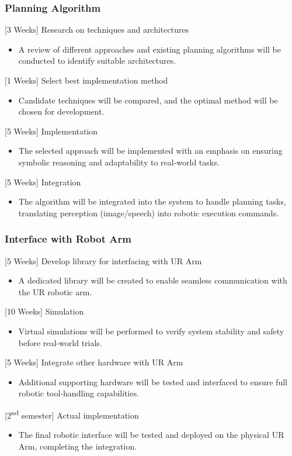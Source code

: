 \documentclass[12pt]{extarticle}
\begin{document}
\subsubsection{Planning Algorithm}
[3 Weeks] Research on techniques and architectures
\begin{itemize}
    \item A review of different approaches and existing planning algorithms will be conducted to identify suitable architectures.
\end{itemize}
[1 Weeks] Select best implementation method
\begin{itemize}
    \item Candidate techniques will be compared, and the optimal method will be chosen for development.
\end{itemize}
[5 Weeks] Implementation
\begin{itemize}
    \item The selected approach will be implemented with an emphasis on ensuring symbolic reasoning and adaptability to real-world tasks.
\end{itemize}
[5 Weeks] Integration
\begin{itemize}
    \item The algorithm will be integrated into the system to handle planning tasks, translating perception (image/speech) into robotic execution commands.
\end{itemize}
\subsubsection{Interface with Robot Arm}
[5 Weeks] Develop library for interfacing with UR Arm
\begin{itemize}
    \item A dedicated library will be created to enable seamless communication with the UR robotic arm.
\end{itemize}
[10 Weeks] Simulation
\begin{itemize}
    \item Virtual simulations will be performed to verify system stability and safety before real-world trials.
\end{itemize}
[5 Weeks] Integrate other hardware with UR Arm
\begin{itemize}
    \item Additional supporting hardware will be tested and interfaced to ensure full robotic tool-handling capabilities.
\end{itemize}
[2\textsuperscript{nd} semester] Actual implementation
\begin{itemize}
    \item The final robotic interface will be tested and deployed on the physical UR Arm, completing the integration.
\end{itemize}
\end{document}
